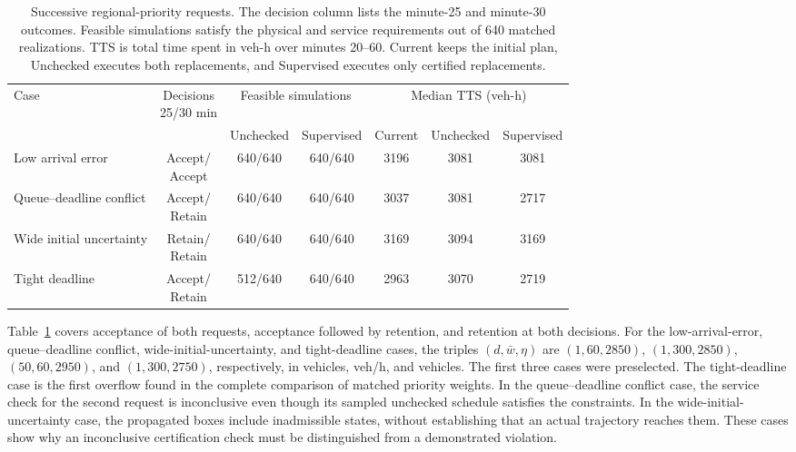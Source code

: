 \begin{table}[!htbp]
\centering\small
\setlength{\belowcaptionskip}{6pt}
\caption{Successive regional-priority requests. The decision column lists
the minute-25 and minute-30 outcomes. Feasible simulations satisfy the
physical and service requirements out of 640 matched realizations.
TTS is total time spent in veh-h over minutes 20--60. Current keeps the
initial plan, Unchecked executes both replacements, and Supervised
executes only certified replacements.}
\label{tab:sequential-handover}
\footnotesize
\setlength{\tabcolsep}{3pt}
\begin{tabularx}{\linewidth}{@{}>{\raggedright\arraybackslash}Xcccccc@{}}
\toprule
Case & \shortstack{Decisions\\25/30 min} & \multicolumn{2}{c}{Feasible simulations} & \multicolumn{3}{c}{Median TTS (veh-h)}\\
 & & Unchecked & Supervised & Current & Unchecked & Supervised\\
\midrule
Low arrival error & \shortstack{Accept/\\Accept} & 640/640 & 640/640 & 3196 & 3081 & 3081\\
Queue--deadline conflict & \shortstack{Accept/\\Retain} & 640/640 & 640/640 & 3037 & 3081 & 2717\\
Wide initial uncertainty & \shortstack{Retain/\\Retain} & 640/640 & 640/640 & 3169 & 3094 & 3169\\
Tight deadline & \shortstack{Accept/\\Retain} & 512/640 & 640/640 & 2963 & 3070 & 2719\\
\bottomrule
\end{tabularx}
\end{table}

Table~\ref{tab:sequential-handover} covers acceptance of both requests,
acceptance followed by retention, and retention at both decisions.
For the low-arrival-error, queue--deadline conflict, wide-initial-uncertainty,
and tight-deadline cases, the triples
$(d,\bar w,\eta)$ are $(1,60,2850)$, $(1,300,2850)$,
$(50,60,2950)$, and $(1,300,2750)$, respectively, in vehicles, veh/h,
and vehicles. The first three cases were preselected. The tight-deadline
case is the first overflow found in the complete comparison of matched
priority weights. In the queue--deadline conflict case, the service check for
the second request is inconclusive even though its sampled unchecked schedule satisfies the
constraints. In the wide-initial-uncertainty case, the propagated boxes include inadmissible states,
without establishing that an actual trajectory reaches them. These cases
show why an inconclusive certification check must be distinguished from a
demonstrated violation.

